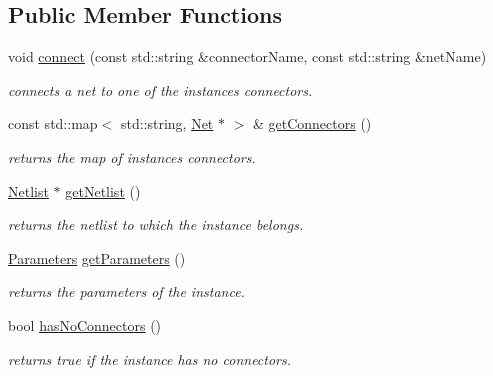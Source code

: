 \subsection*{Public Member Functions}
\begin{DoxyCompactItemize}
\item 
void \hyperlink{class_open_chams_1_1_instance_a96b4f4ce732290340f727169d2e43ee8}{connect} (const std\+::string \&connector\+Name, const std\+::string \&net\+Name)
\begin{DoxyCompactList}\small\item\em connects a net to one of the instance\textquotesingle{}s connectors. \end{DoxyCompactList}\item 
\mbox{\label{class_open_chams_1_1_instance_a745fe0a50eb770ce3bea36ef0e62c8ca}} 
const std\+::map$<$ std\+::string, \hyperlink{class_open_chams_1_1_net}{Net} $\ast$ $>$ \& \hyperlink{class_open_chams_1_1_instance_a745fe0a50eb770ce3bea36ef0e62c8ca}{get\+Connectors} ()
\begin{DoxyCompactList}\small\item\em returns the map of instance\textquotesingle{}s connectors. \end{DoxyCompactList}\item 
\mbox{\label{class_open_chams_1_1_instance_a4085d6a7b6958ffdd7ab5df7e6d6e53f}} 
\hyperlink{class_open_chams_1_1_netlist}{Netlist} $\ast$ \hyperlink{class_open_chams_1_1_instance_a4085d6a7b6958ffdd7ab5df7e6d6e53f}{get\+Netlist} ()
\begin{DoxyCompactList}\small\item\em returns the netlist to which the instance belongs. \end{DoxyCompactList}\item 
\mbox{\label{class_open_chams_1_1_instance_a2e51ad4344607fc279c5c8cda4edae02}} 
\hyperlink{class_open_chams_1_1_parameters}{Parameters} \hyperlink{class_open_chams_1_1_instance_a2e51ad4344607fc279c5c8cda4edae02}{get\+Parameters} ()
\begin{DoxyCompactList}\small\item\em returns the parameters of the instance. \end{DoxyCompactList}\item 
\mbox{\label{class_open_chams_1_1_instance_a44b9dfed39a5ff0c70ec99eea6ecec1a}} 
bool \hyperlink{class_open_chams_1_1_instance_a44b9dfed39a5ff0c70ec99eea6ecec1a}{has\+No\+Connectors} ()
\begin{DoxyCompactList}\small\item\em returns true if the instance has no connectors. \end{DoxyCompactList}\end{DoxyCompactItemize}


